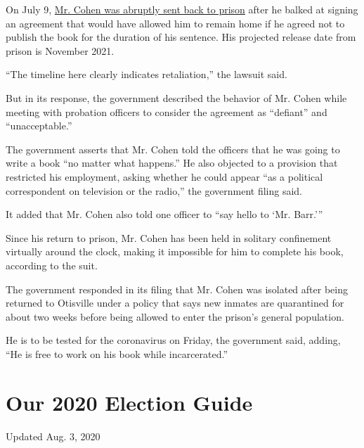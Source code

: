 On July 9,
\href{https://www.nytimes.com/2020/07/09/nyregion/michael-cohen-arrested.html}{Mr.
Cohen was abruptly sent back to prison} after he balked at signing an
agreement that would have allowed him to remain home if he agreed not to
publish the book for the duration of his sentence. His projected release
date from prison is November 2021.

``The timeline here clearly indicates retaliation,'' the lawsuit said.

But in its response, the government described the behavior of Mr. Cohen
while meeting with probation officers to consider the agreement as
``defiant'' and ``unacceptable.''

The government asserts that Mr. Cohen told the officers that he was
going to write a book ``no matter what happens.'' He also objected to a
provision that restricted his employment, asking whether he could appear
``as a political correspondent on television or the radio,'' the
government filing said.

It added that Mr. Cohen also told one officer to ``say hello to `Mr.
Barr.'''

Since his return to prison, Mr. Cohen has been held in solitary
confinement virtually around the clock, making it impossible for him to
complete his book, according to the suit.

The government responded in its filing that Mr. Cohen was isolated after
being returned to Otisville under a policy that says new inmates are
quarantined for about two weeks before being allowed to enter the
prison's general population.

He is to be tested for the coronavirus on Friday, the government said,
adding, ``He is free to work on his book while incarcerated.''

\hypertarget{our-2020-election-guide}{%
\section{Our 2020 Election Guide}\label{our-2020-election-guide}}

Updated Aug. 3, 2020

